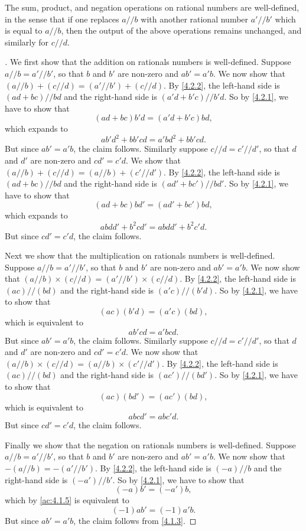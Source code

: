 \begin{lem}\label{4.2.3}
  The sum, product, and negation operations on rational numbers are well-defined, in the sense that if one replaces \(a // b\) with another rational number \(a' // b'\) which is equal to \(a // b\), then the output of the above operations remains unchanged, and similarly for \(c // d\).
\end{lem}

\begin{proof}[]
  We first show that the addition on rationals numbers is well-defined.
  Suppose \(a // b = a' // b'\), so that \(b\) and \(b'\) are non-zero and \(ab' = a'b\).
  We now show that \((a // b) + (c // d) = (a' // b') + (c // d)\).
  By \cref{4.2.2}, the left-hand side is \((ad + bc) // bd\) and the right-hand side is \((a'd + b'c) // b'd\).
  So by \cref{4.2.1}, we have to show that
  \[
    (ad + bc)b'd = (a'd + b'c)bd,
  \]
  which expands to
  \[
    ab'd^2 + bb'cd = a'bd^2 + bb'cd.
  \]
  But since \(ab' = a'b\), the claim follows.
  Similarly suppose \(c // d = c' // d'\), so that \(d\) and \(d'\) are non-zero and \(cd' = c'd\).
  We show that \((a // b) + (c // d) = (a // b) + (c' // d')\).
  By \cref{4.2.2}, the left-hand side is \((ad + bc) // bd\) and the right-hand side is \((ad' + bc') // bd'\).
  So by \cref{4.2.1}, we have to show that
  \[
    (ad + bc)bd' = (ad' + bc')bd,
  \]
  which expands to
  \[
    abdd' + b^2cd' = abdd' + b^2c'd.
  \]
  But since \(cd' = c'd\), the claim follows.

  Next we show that the multiplication on rationals numbers is well-defined.
  Suppose \(a // b = a' // b'\), so that \(b\) and \(b'\) are non-zero and \(ab' = a'b\).
  We now show that \((a // b) \times (c // d) = (a' // b') \times (c // d)\).
  By \cref{4.2.2}, the left-hand side is \((ac) // (bd)\) and the right-hand side is \((a'c) // (b'd)\).
  So by \cref{4.2.1}, we have to show that
  \[
    (ac)(b'd) = (a'c)(bd),
  \]
  which is equivalent to
  \[
    ab'cd = a'bcd.
  \]
  But since \(ab' = a'b\), the claim follows.
  Similarly suppose \(c // d = c' // d'\), so that \(d\) and \(d'\) are non-zero and \(cd' = c'd\).
  We now show that \((a // b) \times (c // d) = (a // b) \times (c' // d')\).
  By \cref{4.2.2}, the left-hand side is \((ac) // (bd)\) and the right-hand side is \((ac') // (bd')\).
  So by \cref{4.2.1}, we have to show that
  \[
    (ac)(bd') = (ac')(bd),
  \]
  which is equivalent to
  \[
    abcd' = abc'd.
  \]
  But since \(cd' = c'd\), the claim follows.

  Finally we show that the negation on rationals numbers is well-defined.
  Suppose \(a // b = a' // b'\), so that \(b\) and \(b'\) are non-zero and \(ab' = a'b\).
  We now show that \(-(a // b) = -(a' // b')\).
  By \cref{4.2.2}, the left-hand side is \((-a) // b\) and the right-hand side is \((-a') // b'\).
  So by \cref{4.2.1}, we have to show that
  \[
    (-a)b' = (-a')b,
  \]
  which by \cref{ac:4.1.5} is equivalent to
  \[
    (-1)ab' = (-1)a'b.
  \]
  But since \(ab' = a'b\), the claim follows from \cref{4.1.3}.
\end{proof}

